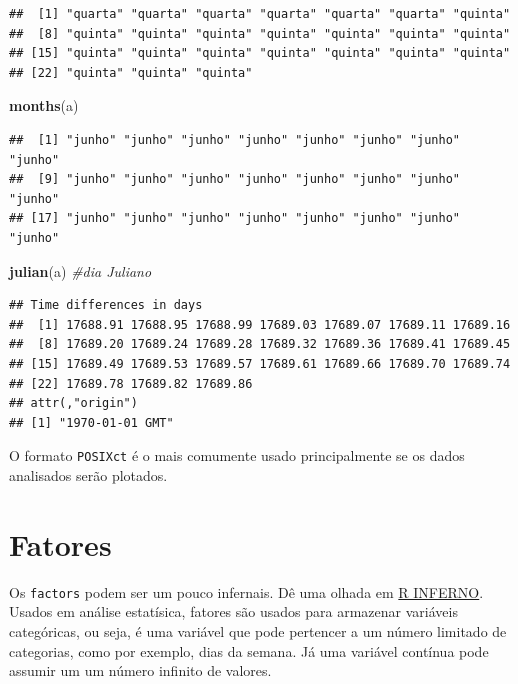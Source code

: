 \documentclass[]{book}
\newenvironment{Shaded}{\begin{snugshade}}{\end{snugshade}}
\newcommand{\KeywordTok}[1]{\textcolor[rgb]{0.13,0.29,0.53}{\textbf{#1}}}
\newcommand{\CommentTok}[1]{\textcolor[rgb]{0.56,0.35,0.01}{\textit{#1}}}
\newcommand{\NormalTok}[1]{#1}
\theoremstyle{definition}
\theoremstyle{definition}
\theoremstyle{definition}
\theoremstyle{remark}
\begin{document}
\begin{verbatim}
##  [1] "quarta" "quarta" "quarta" "quarta" "quarta" "quarta" "quinta"
##  [8] "quinta" "quinta" "quinta" "quinta" "quinta" "quinta" "quinta"
## [15] "quinta" "quinta" "quinta" "quinta" "quinta" "quinta" "quinta"
## [22] "quinta" "quinta" "quinta"
\end{verbatim}

\begin{Shaded}
\begin{Highlighting}[]
\KeywordTok{months}\NormalTok{(a)}
\end{Highlighting}
\end{Shaded}

\begin{verbatim}
##  [1] "junho" "junho" "junho" "junho" "junho" "junho" "junho" "junho"
##  [9] "junho" "junho" "junho" "junho" "junho" "junho" "junho" "junho"
## [17] "junho" "junho" "junho" "junho" "junho" "junho" "junho" "junho"
\end{verbatim}

\begin{Shaded}
\begin{Highlighting}[]
\KeywordTok{julian}\NormalTok{(a) }\CommentTok{#dia Juliano}
\end{Highlighting}
\end{Shaded}

\begin{verbatim}
## Time differences in days
##  [1] 17688.91 17688.95 17688.99 17689.03 17689.07 17689.11 17689.16
##  [8] 17689.20 17689.24 17689.28 17689.32 17689.36 17689.41 17689.45
## [15] 17689.49 17689.53 17689.57 17689.61 17689.66 17689.70 17689.74
## [22] 17689.78 17689.82 17689.86
## attr(,"origin")
## [1] "1970-01-01 GMT"
\end{verbatim}

O formato \texttt{POSIXct} é o mais comumente usado principalmente se os
dados analisados serão plotados.

\section{Fatores}\label{fatores}

Os \texttt{factors} podem ser um pouco infernais. Dê uma olhada em
\href{http://www.burns-stat.com/documents/books/the-r-inferno/}{R
INFERNO}.\\
Usados em análise estatísica, fatores são usados para armazenar
variáveis categóricas, ou seja, é uma variável que pode pertencer a um
número limitado de categorias, como por exemplo, dias da semana. Já uma
variável contínua pode assumir um um número infinito de valores.
\end{document}
